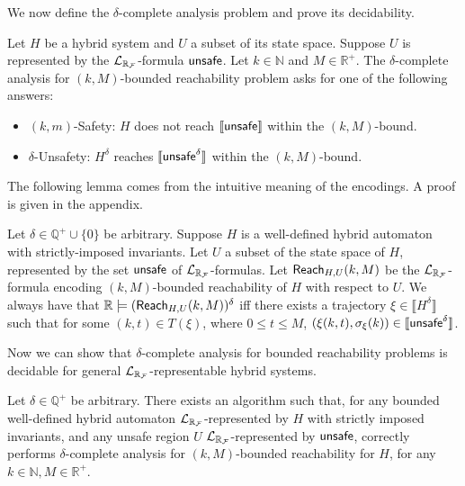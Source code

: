 \documentclass[10pt,envcountsect]{llncs}
\begin{document}
We now define the $\delta$-complete analysis problem and prove its decidability.
\begin{definition}
Let $H$ be a hybrid system and $U$ a subset of its state space. Suppose $U$ is represented by the $\mathcal{L}_{\mathbb{R}_{\mathcal{F}}}$-formula $\mathsf{unsafe}$. Let $k\in \mathbb{N}$ and $M\in \mathbb{R}^+$. The $\delta$-complete analysis for $(k,M)$-bounded reachability problem asks for one of the following answers:
\begin{itemize}
\item {\sf $(k,m)$-Safety:} $H$ does not reach $\llbracket\mathsf{unsafe}\rrbracket$ within the $(k,M)$-bound.
\item {\sf $\delta$-Unsafety:} $H^{\delta}$ reaches $\llbracket\mathsf{unsafe}^{\delta}\rrbracket$ within the $(k,M)$-bound.
\end{itemize}
\end{definition}
The following lemma comes from the intuitive meaning of the encodings. A proof is given in the appendix. 
\begin{lemma}\label{equiv-delta}
Let $\delta\in\mathbb{Q}^+\cup \{0\}$ be arbitrary. Suppose $H$ is a well-defined hybrid automaton with strictly-imposed invariants. Let $U$ a subset of the state space of $H$, represented by the set  $\mathsf{unsafe}$ of $\mathcal{L}_{\mathbb{R}_{\mathcal{F}}}$-formulas. Let $\mathsf{Reach}_{H,U}(k,M)$ be the $\mathcal{L}_{\mathbb{R}_{\mathcal{F}}}$-formula encoding $(k,M)$-bounded reachability of $H$ with respect to $U$.  We always have that $\mathbb{R}\models(\mathsf{Reach}_{H,U}(k,M))^{\delta}$ iff there exists a trajectory $\xi\in\llbracket H^{\delta}\rrbracket$ such that for some $(k,t)\in T(\xi)$, where $0\leq t\leq M$, $(\xi(k, t), \sigma_{\xi}(k))\in \llbracket \mathsf{unsafe}^{\delta}\rrbracket$.
\end{lemma}
Now we can show that $\delta$-complete analysis for bounded reachability problems is decidable for general $\mathcal{L}_{\mathbb{R}_{\mathcal{F}}}$-representable hybrid systems.
\begin{theorem}[Decidability]
Let $\delta\in \mathbb{Q}^+$ be arbitrary. There exists an algorithm such that, for any bounded well-defined hybrid automaton $\mathcal{L}_{\mathbb{R}_{\mathcal{F}}}$-represented by $H$ with strictly imposed invariants, and any unsafe region $U$ $\mathcal{L}_{\mathbb{R}_{\mathcal{F}}}$-represented by $\mathsf{unsafe}$, correctly performs $\delta$-complete analysis for $(k,M)$-bounded reachability for $H$, for any $k\in \mathbb{N}, M\in \mathbb{R}^+$.
\end{theorem}
\end{document}
